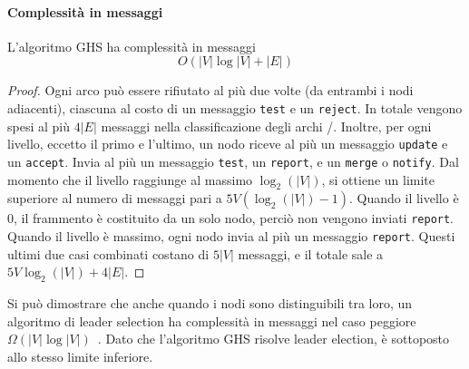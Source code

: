 \documentclass[target=bach,aauheader=,style=]{thud}
\newcommand{\eng}[1]{\foreignlanguage{english}{#1}}
\begin{document}
\paragraph{Complessità in messaggi}
L'algoritmo GHS ha complessità in messaggi
$$
O(|V|\log |V|+|E|)
$$
\begin{proof}
Ogni arco può essere rifiutato al più due volte (da entrambi i nodi adiacenti), ciascuna al costo di un messaggio \lstinline{test} e un \lstinline{reject}. In totale vengono spesi al più $4|E|$ messaggi nella classificazione degli archi \rejected/. Inoltre, per ogni livello, eccetto il primo e l'ultimo, un nodo riceve al più un messaggio \lstinline{update} e un \lstinline{accept}. Invia al più un messaggio \lstinline{test}, un \lstinline{report}, e un \lstinline{merge} o \lstinline{notify}. Dal momento che il livello raggiunge al massimo $\log_2(|V|)$, si ottiene un limite superiore al numero di messaggi pari a $5V(\log_2(|V|)-1)$. Quando il livello è $0$, il frammento è costituito da un solo nodo, perciò non vengono inviati \lstinline{report}. Quando il livello è massimo, ogni nodo invia al più un messaggio \lstinline{report}. Questi ultimi due casi combinati costano di $5|V|$ messaggi, e il totale sale a $5V\log_2(|V|)+4|E|$.
\end{proof}
Si può dimostrare che anche quando i nodi sono distinguibili tra loro, un algoritmo di leader \eng{selection} ha complessità in messaggi nel caso peggiore $\Omega(|V|\log |V|)$~\cite{10.1145/7531.7919}. Dato che l'algoritmo GHS risolve leader \eng{election}, è sottoposto allo stesso limite inferiore.
\end{document}
